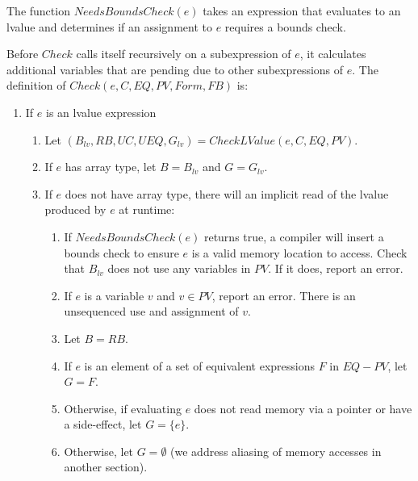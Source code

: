 The function $NeedsBoundsCheck(e)$ takes
an expression that evaluates to an lvalue and determines if an 
assignment to $e$ requires a bounds check.

Before $Check$ calls itself recursively on a subexpression of $e$, it calculates 
additional variables that are pending due to other subexpressions of $e$.
The definition of $Check(e, C, EQ, PV, Form, FB)$ is:
\begin{enumerate}
\item If $e$ is an lvalue expression
\begin{enumerate}
\item Let $(B_{lv}, RB, \mathit{UC}, UEQ, G_{lv}) = CheckLValue(e, C, EQ,PV)$.
\item If $e$ has array type, let $B = B_{lv}$ and $G = G_{lv}$.
\item If $e$ does not have array type, there will an implicit read of the lvalue produced by $e$
at runtime:
\begin{enumerate}
\item If $NeedsBoundsCheck(e)$ returns true, a compiler will insert a bounds check 
to ensure $e$ is a valid memory location to access.  Check that $B_{lv}$ does not use any variables in 
$PV$.  If it does, report an error.
\item If $e$ is a variable $v$ and $v \in PV$, report an error.  There is an unsequenced use and
assignment of $v$.
\item Let $B = RB$. 
\item If $e$ is an element of a set of equivalent expressions $F$ in $EQ - PV$, let $G = F$. 
\item Otherwise, if evaluating $e$ does not read memory via a pointer or have a side-effect, let $G = \{ e \}$.  
\item Otherwise, let $G = \emptyset$ (we address aliasing of memory accesses in another section).
\end{enumerate}
\end{enumerate}



\end{enumerate}
